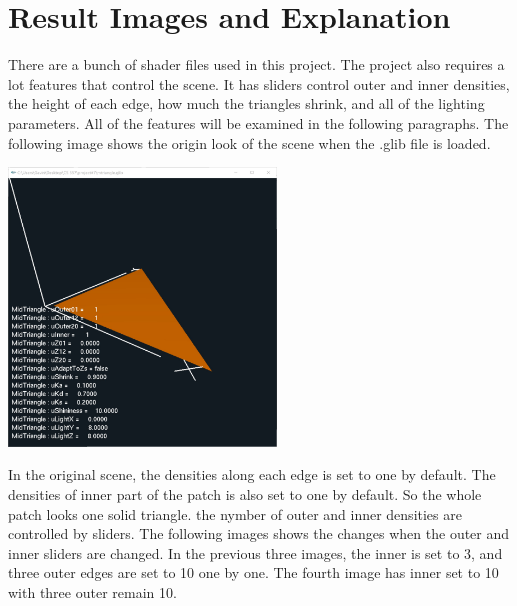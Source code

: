 \documentclass[letterpaper,14pt,titlepage,fleqn]{article}
\begin{document}
\section{Result Images and Explanation}
There are a bunch of shader files used in this project. The project also requires a lot features that control the scene. It has sliders control outer and inner densities, the height of each edge, how much the triangles shrink, and all of the lighting parameters. All of the features will be examined in the following paragraphs. The following image shows the origin look of the scene when the .glib file is loaded.
\begin{center}
	\includegraphics[width=2.8in]{origin.jpg}
\end{center}
In the original scene, the densities along each edge is set to one by default. The densities of inner part of the patch is also set to one by default. So the whole patch looks one solid triangle. the nymber of outer and inner densities are controlled by sliders. The following images shows the changes when the outer and inner sliders are changed. In the previous three images, the inner is set to 3, and three outer edges are set to 10 one by one. The fourth image has inner set to 10 with three outer remain 10.
\end{document}
